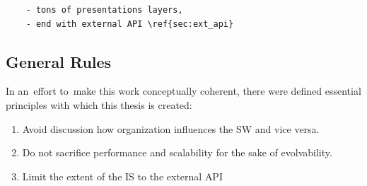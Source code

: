 \documentclass[thesis=M,english,hidelinks]{FITthesis}[2012/10/20]
\begin{document}
\begin{verbatim}
    - tons of presentations layers, 
    - end with external API \ref{sec:ext_api}
\end{verbatim}

\subsection{General Rules}
In an~effort to~make this work conceptually coherent, there were defined essential principles with which this thesis is created:
\begin{enumerate}
    \item Avoid discussion how organization influences the \acrshort{SW} and vice versa.
    \item Do not sacrifice performance and scalability for the sake of evolvability.
    \item Limit the extent of the \acrshort{IS} to the external \acrshort{API} 
\end{enumerate}
\end{document}
